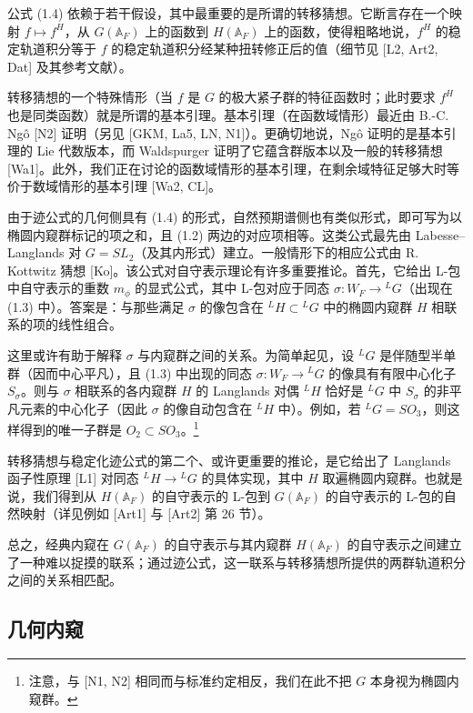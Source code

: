 公式 (1.4) 依赖于若干假设，其中最重要的是所谓的转移猜想。它断言存在一个映射 $f\mapsto f^H$，从 $G(\mathbb{A}_F)$ 上的函数到 $H(\mathbb{A}_F)$ 上的函数，使得粗略地说，$f^H$ 的稳定轨道积分等于 $f$ 的稳定轨道积分经某种扭转修正后的值（细节见 [L2, Art2, Dat] 及其参考文献）。

转移猜想的一个特殊情形（当 $f$ 是 $G$ 的极大紧子群的特征函数时；此时要求 $f^H$ 也是同类函数）就是所谓的基本引理。基本引理（在函数域情形）最近由 B.-C. Ngô [N2] 证明（另见 [GKM, La5, LN, N1]）。更确切地说，Ngô 证明的是基本引理的 Lie 代数版本，而 Waldspurger 证明了它蕴含群版本以及一般的转移猜想 [Wa1]。此外，我们正在讨论的函数域情形的基本引理，在剩余域特征足够大时等价于数域情形的基本引理 [Wa2, CL]。

由于迹公式的几何侧具有 (1.4) 的形式，自然预期谱侧也有类似形式，即可写为以椭圆内窥群标记的项之和，且 (1.2) 两边的对应项相等。这类公式最先由 Labesse--Langlands 对 $G=SL_2$（及其内形式）建立。一般情形下的相应公式由 R. Kottwitz 猜想 [Ko]。该公式对自守表示理论有许多重要推论。首先，它给出 L-包中自守表示的重数 $m_\phi$ 的显式公式，其中 L-包对应于同态 $\sigma:W_F\to{}^{L}G$（出现在 (1.3) 中）。答案是：与那些满足 $\sigma$ 的像包含在 ${}^{L}H\subset{}^{L}G$ 中的椭圆内窥群 $H$ 相联系的项的线性组合。

这里或许有助于解释 $\sigma$ 与内窥群之间的关系。为简单起见，设 ${}^{L}G$ 是伴随型半单群（因而中心平凡），且 (1.3) 中出现的同态 $\sigma:W_F\to{}^{L}G$ 的像具有有限中心化子 $S_\sigma$。则与 $\sigma$ 相联系的各内窥群 $H$ 的 Langlands 对偶 ${}^{L}H$ 恰好是 ${}^{L}G$ 中 $S_\sigma$ 的非平凡元素的中心化子（因此 $\sigma$ 的像自动包含在 ${}^{L}H$ 中）。例如，若 ${}^{L}G=SO_3$，则这样得到的唯一子群是 $O_2\subset SO_3$。\footnote{注意，与 [N1, N2] 相同而与标准约定相反，我们在此不把 $G$ 本身视为椭圆内窥群。}

转移猜想与稳定化迹公式的第二个、或许更重要的推论，是它给出了 Langlands 函子性原理 [L1] 对同态 ${}^{L}H\to{}^{L}G$ 的具体实现，其中 $H$ 取遍椭圆内窥群。也就是说，我们得到从 $H(\mathbb{A}_F)$ 的自守表示的 L-包到 $G(\mathbb{A}_F)$ 的自守表示的 L-包的自然映射（详见例如 [Art1] 与 [Art2] 第 26 节）。

总之，经典内窥在 $G(\mathbb{A}_F)$ 的自守表示与其内窥群 $H(\mathbb{A}_F)$ 的自守表示之间建立了一种难以捉摸的联系；通过迹公式，这一联系与转移猜想所提供的两群轨道积分之间的关系相匹配。

\subsection{几何内窥}


